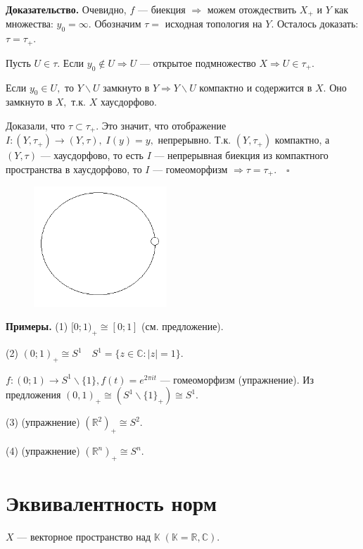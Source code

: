 \documentclass[12pt,a4paper]{article}
\begin{document}
\textbf{Доказательство.} Очевидно, $f$ --- биекция $\Rightarrow$ можем отождествить $X_{+}$ и $Y$ как множества: $y_{0} = \infty.$ Обозначим $\tau =$ исходная топология на $Y.$ Осталось доказать: $\tau = \tau_{+}.$ 

Пусть $U \in \tau.$ Если $y_{0} \not \in U \Rightarrow U$ --- открытое подмножество $X \Rightarrow U \in \tau_{+}.$

Если $y_{0} \in U,$ то $Y \backslash U$ замкнуто в $Y \Rightarrow Y \backslash U$ компактно и содержится в $X.$ Оно замкнуто в $X,$ т.к. $X$ хаусдорфово. 

Доказали, что $\tau \subset \tau_{+}.$ Это значит, что отображение $I\!: (Y, \tau_{+}) \to (Y, \tau), \; I(y) = y,$ непрерывно. Т.к. $(Y, \tau_{+})$ компактно, а $(Y, \tau)$ --- хаусдорфово, то есть $I$ --- непрерывная биекция из компактного пространства в хаусдорфово, то $I$ --- гомеоморфизм $\Rightarrow \tau = \tau_{+}. \quad \square$

\begin{figure}
	\includegraphics[width = 5cm]{lect10_3.png}
\end{figure}

\textbf{Примеры.} (1) $[0; 1)_{+} \cong [0; 1]$ (см. предложение).

(2) $(0; 1)_{+} \cong S^{1} \quad S^{1} = \{z \in \mathbb{C}\!: |z| = 1\}.$

$f\!: (0; 1) \to S^{1} \backslash \{1\}, f(t) = e^{2\pi i t}$ --- гомеоморфизм (упражнение). Из предложения $(0, 1)_{+} \cong (S^{1} \backslash \{1\}_{+}) \cong S^{1}.$

(3) (упражнение) $(\mathbb{R}^{2})_{+} \cong S^{2}.$

(4) (упражнение) $(\mathbb{R}^{n})_{+} \cong S^{n}.$

\section{Эквивалентность норм}

$X$ --- векторное пространство над $\mathbb{K} \; (\mathbb{K} = \mathbb{R}, \mathbb{C}).$
\end{document}
